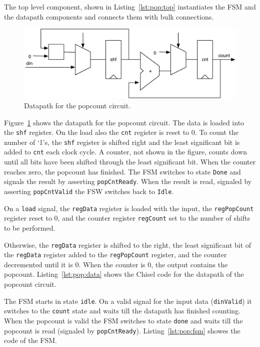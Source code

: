 \documentclass[%
    10pt,
    headinclude, footexclude,
    openright, %
    notitlepage,
    cleardoubleempty,
    headsepline,
    pointlessnumbers,
    bibtotoc, idxtotoc,
    ]{scrbook}
\newcommand{\code}[1]{{\small{\texttt{#1}}}}
\newcommand{\scale}{0.7}
\begin{document}
The top level component, shown in Listing~\ref{lst:pop:top} instantiates the FSM and the datapath components and connects
them with bulk connections.


\begin{figure}
  \centering
  \includegraphics[scale=\scale]{figures/popcnt-data}
  \caption{Datapath for the popcount circuit.}
  \label{fig:popcnt-data}
\end{figure}

Figure~\ref{fig:popcnt-data} shows the datapath for the popcount circuit.
The data is loaded into the \code{shf} register. On the load also the \code{cnt}
register is reset to 0. To count the number of `1's, the \code{shf} register is shifted
right and the least significant bit is added to \code{cnt} each clock cycle.
A counter, not shown in the figure, counts down until all bits have been shifted
through the least significant bit. When the counter reaches zero, the popcount
has finished. The FSM switches to state \code{Done} and signals the result
by asserting \code{popCntReady}. When the result is read, signaled by asserting
\code{popCntValid} the FSW switches back to \code{Idle}.

On a \code{load} signal, the \code{regData} register is loaded with the input,
the \code{regPopCount} register reset to 0, and the counter register \code{regCount}
set to the number of shifts to be performed.

Otherwise, the \code{regData} register is shifted to the right, the least significant bit
of the \code{regData} register added to the \code{regPopCount} register, and the counter
decremented until it is 0. When the counter is 0, the output contains the popcount.
Listing~\ref{lst:pop:data} shows the Chisel code for the datapath of the popcount
circuit.


The FSM starts in state \code{idle}. On a valid signal for the input data (\code{dinValid}) it
switches to the \code{count} state and waits till the datapath has finished counting.
When the popcount is valid the FSM switches to state \code{done} and waits till the
popcount is read (signaled by \code{popCntReady}).
Listing~\ref{lst:pop:fsm} showes the code of the FSM.
\end{document}
